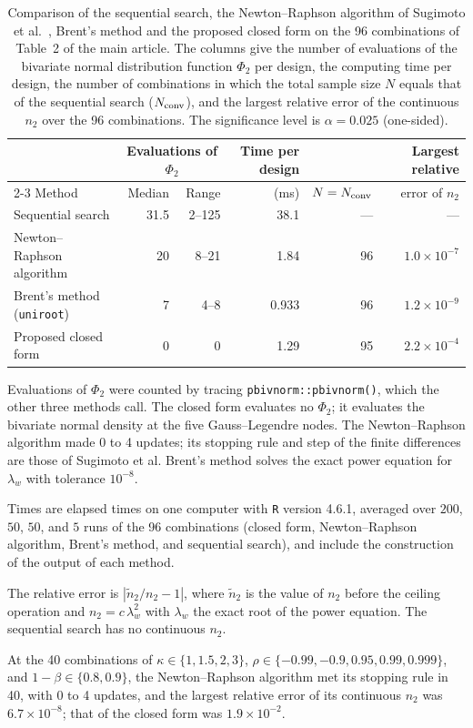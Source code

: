 \begin{table}[ht]
\centering
\footnotesize
\caption{Comparison of the sequential search, the Newton--Raphson algorithm of Sugimoto et al.~\cite{Sugimoto2012}, Brent's method and the proposed closed form on the 96 combinations of Table~2 of the main article. The columns give the number of evaluations of the bivariate normal distribution function $\Phi_2$ per design, the computing time per design, the number of combinations in which the total sample size $N$ equals that of the sequential search ($N_{\rm conv}$), and the largest relative error of the continuous $n_2$ over the 96 combinations. The significance level is $\alpha = 0.025$ (one-sided).}
\label{tab:cost_comparison}
\begin{threeparttable}
\begin{tabular}{lrrrrr}
\hline
 & \multicolumn{2}{c}{Evaluations of $\Phi_2$} & Time per design & & Largest relative \\
\cline{2-3}
Method & Median & Range & (ms) & $N = N_{\rm conv}$ & error of $n_2$ \\
\hline
Sequential search & 31.5 & 2--125 & 38.1 & --- & --- \\
Newton--Raphson algorithm &   20 & 8--21 & 1.84 & 96 & $1.0 \times 10^{-7}$ \\
Brent's method (\texttt{uniroot}) &    7 & 4--8 & 0.933 & 96 & $1.2 \times 10^{-9}$ \\
Proposed closed form & 0 & 0 & 1.29 & 95 & $2.2 \times 10^{-4}$ \\
\hline
\end{tabular}
\begin{tablenotes}
\footnotesize
\item[] Evaluations of $\Phi_2$ were counted by tracing \texttt{pbivnorm::pbivnorm()}, which the other three methods call. The closed form evaluates no $\Phi_2$; it evaluates the bivariate normal density at the five Gauss--Legendre nodes. The Newton--Raphson algorithm made 0 to 4 updates; its stopping rule and step of the finite differences are those of Sugimoto et al. Brent's method solves the exact power equation for $\lambda_w$ with tolerance $10^{-8}$.
\item[] Times are elapsed times on one computer with \texttt{R} version 4.6.1, averaged over $200$, $50$, $50$, and $5$ runs of the 96 combinations (closed form, Newton--Raphson algorithm, Brent's method, and sequential search), and include the construction of the output of each method.
\item[] The relative error is $|\tilde n_2 / n_2 - 1|$, where $\tilde n_2$ is the value of $n_2$ before the ceiling operation and $n_2 = c\,\lambda_w^2$ with $\lambda_w$ the exact root of the power equation. The sequential search has no continuous $n_2$.
\item[] At the 40 combinations of $\kappa \in \{1, 1.5, 2, 3\}$, $\rho \in \{-0.99, -0.9, 0.95, 0.99, 0.999\}$, and $1 - \beta \in \{0.8, 0.9\}$, the Newton--Raphson algorithm met its stopping rule in 40, with 0 to 4 updates, and the largest relative error of its continuous $n_2$ was $6.7 \times 10^{-8}$; that of the closed form was $1.9 \times 10^{-2}$.
\end{tablenotes}
\end{threeparttable}
\end{table}
